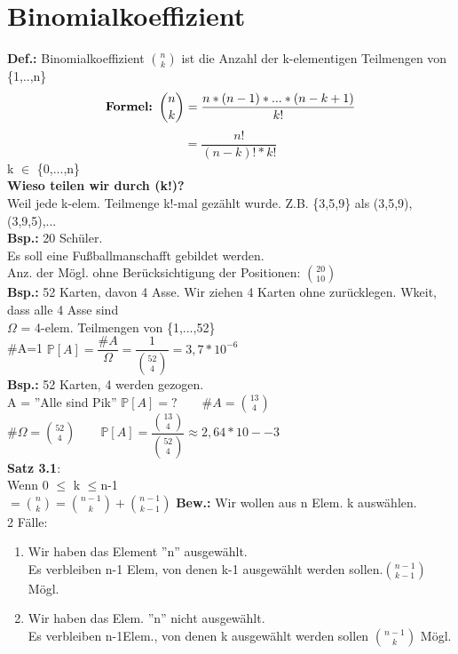 \section{Binomialkoeffizient}
\textbf{Def.:} Binomialkoeffizient $\binom{n}{k}$ ist die Anzahl der k-elementigen Teilmengen von \{1,..,n\}\medskip\\
 $$\text{\textbf{Formel: }}\binom{n}{k}= \frac{n*(n-1)*...*(n-k+1)}{k!}$$
 $$=\frac{n!}{(n-k)!*k!}$$ k $\in$ \{0,...,n\}\smallskip\\
\textbf{ Wieso teilen wir durch (k!)?}\\
 Weil jede k-elem. Teilmenge k!-mal gezählt wurde. Z.B. \{3,5,9\} als (3,5,9), (3,9,5),...\\
 \textbf{Bsp.:} 20 Schüler.\\Es soll eine Fußballmanschafft gebildet werden.\\
 Anz. der Mögl. ohne Berücksichtigung der Positionen: $\binom{20}{10}$\medskip\\
 \textbf{Bsp.:} 52 Karten, davon 4 Asse. Wir ziehen 4 Karten ohne zurücklegen. Wkeit, dass alle 4 Asse sind\\
 $\Omega$ = 4-elem. Teilmengen von \{1,...,52\}\\
 \#A=1 \hspace{1cm} $\mathds{P}[A]=\dfrac{\#A}{\Omega}=\dfrac{1}{\binom{52}{4}}=3,7*10^{-6}$\medskip\\
 \textbf{Bsp.:} 52 Karten, 4 werden gezogen.\\
 A = ''Alle sind Pik''
 $\mathds{P}[A]= ? \qquad \#A=\binom{13}{4} $\\
 \#$\Omega = \binom{52}{4} \qquad \mathds{P}[A] = \dfrac{\binom{13}{4}}{\binom{52}{4}} \approx 2,64*10-{-3} $\medskip\\
 \textbf{Satz 3.1}:\\ Wenn 0 $\leq$ k $\leq$n-1\\
 $=\binom{n}{k}=\binom{n-1}{k}+\binom{n-1}{k-1}$\newpage
 \textbf{Bew.:} Wir wollen aus n Elem. k auswählen.\\
 2 Fälle:
 \begin{enumerate}
 	\item Wir haben das Element ''n'' ausgewählt. \\ Es verbleiben n-1 Elem, von denen k-1 ausgewählt werden sollen.$\binom{n-1}{k-1}$ Mögl.
 	\item Wir haben das Elem. ''n'' nicht ausgewählt.\\
 	Es verbleiben n-1Elem., von denen k ausgewählt werden sollen $\binom{n-1}{k}$ Mögl.
 \end{enumerate}
